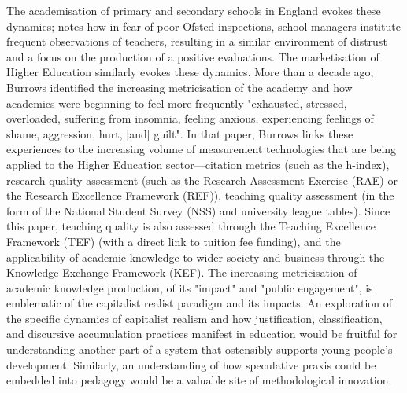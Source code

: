 The academisation of primary and secondary schools in England evokes these dynamics; \citet[p. 1118]{kauko_evaluation_2015} notes how in fear of poor Ofsted inspections, school managers institute frequent observations of teachers, resulting in a similar environment of distrust and a focus on the production of a positive evaluations. The marketisation of Higher Education similarly evokes these dynamics. More than a decade ago, Burrows \citeyearpar[p. 355]{burrows_living_2012} identified the increasing metricisation of the academy and how academics were beginning to feel more frequently "exhausted, stressed, overloaded, suffering from insomnia, feeling anxious, experiencing feelings of shame, aggression, hurt, [and] guilt". In that paper, Burrows links these experiences to the increasing volume of measurement technologies that are being applied to the Higher Education sector—citation metrics (such as the h-index), research quality assessment (such as the Research Assessment Exercise (RAE) or the Research Excellence Framework (REF)), teaching quality assessment (in the form of the National Student Survey (NSS) and university league tables). Since this paper, teaching quality is also assessed through the Teaching Excellence Framework (TEF) (with a direct link to tuition fee funding), and the applicability of academic knowledge to wider society and business through the Knowledge Exchange Framework (KEF). The increasing metricisation of academic knowledge production, of its "impact" and "public engagement", is emblematic of the capitalist realist paradigm and its impacts.  An exploration of the specific dynamics of capitalist realism and how justification, classification, and discursive accumulation practices manifest in education would be fruitful for understanding another part of a system that ostensibly supports young people's development. Similarly, an understanding of how speculative praxis could be embedded into pedagogy would be a valuable site of methodological innovation.

